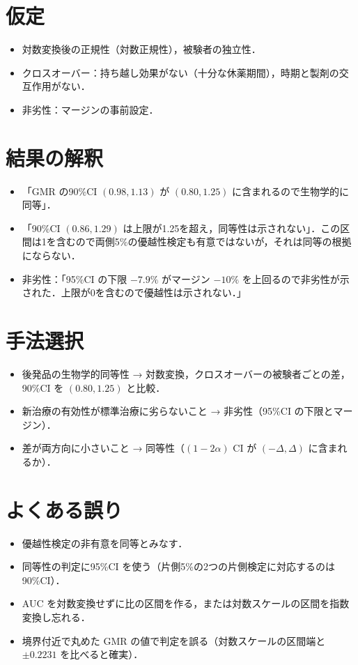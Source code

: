 \documentclass[a4paper,11pt,openany]{ltjsbook}
\begin{document}
\section{仮定}\label{sec:13-assump}
\begin{itemize}
\item 対数変換後の正規性（対数正規性），被験者の独立性．
\item クロスオーバー：持ち越し効果がない（十分な休薬期間），時期と製剤の交互作用がない．
\item 非劣性：マージンの事前設定．
\end{itemize}

\section{結果の解釈}\label{sec:13-interp}
\begin{itemize}
\item 「GMR の90\%CI $(0.98,1.13)$ が $(0.80,1.25)$ に含まれるので生物学的に同等」．
\item 「90\%CI $(0.86,1.29)$ は上限が1.25を超え，同等性は示されない」．この区間は1を含むので両側5\%の優越性検定も有意ではないが，それは同等の根拠にならない．
\item 非劣性：「95\%CI の下限 $-7.9\%$ がマージン $-10\%$ を上回るので非劣性が示された．上限が0を含むので優越性は示されない．」
\end{itemize}

\section{手法選択}\label{sec:13-choice}
\begin{itemize}
\item 後発品の生物学的同等性 → 対数変換，クロスオーバーの被験者ごとの差，90\%CI を $(0.80,1.25)$ と比較．
\item 新治療の有効性が標準治療に劣らないこと → 非劣性（95\%CI の下限とマージン）．
\item 差が両方向に小さいこと → 同等性（$(1-2\alpha)$ CI が $(-\Delta,\Delta)$ に含まれるか）．
\end{itemize}

\section{よくある誤り}\label{sec:13-err}
\begin{warnbox}
\begin{itemize}
\item 優越性検定の非有意を同等とみなす．
\item 同等性の判定に95\%CI を使う（片側5\%の2つの片側検定に対応するのは90\%CI）．
\item AUC を対数変換せずに比の区間を作る，または対数スケールの区間を指数変換し忘れる．
\item 境界付近で丸めた GMR の値で判定を誤る（対数スケールの区間端と $\pm0.2231$ を比べると確実）．
\end{itemize}
\end{warnbox}
\end{document}
